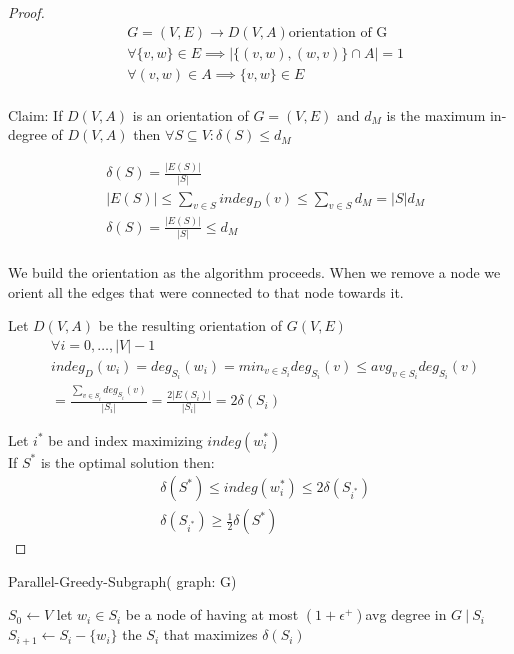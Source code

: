 \documentclass[]{article}
\begin{document}
\begin{proof}
	\begin{align*}
	&G=(V,E) \rightarrow D(V,A) \text{orientation of G}\\
	&\forall \{v, w\} \in E \implies |\{(v, w), (w, v)\}\cap A| = 1\\
	&\forall (v, w) \in A \implies \{v, w\}\in E\\
	\end{align*}
	
	Claim: If $D(V,A)$ is an orientation of $G=(V,E)$ and $d_M$ is the maximum in-degree of $D(V,A)$ then $\forall S \subseteq V: \delta(S) \leq d_M$
	
	\begin{align*}
		&\delta (S) = \frac{|E(S)|}{|S|}\\
		&|E(S)| \leq \sum_{v\in S}^{} indeg_D(v) \leq \sum_{v\in S}^{} d_M = |S| d_M\\
		&\delta (S) = \frac{|E(S)|}{|S|} \leq d_M\\
	\end{align*}
	
	We build the orientation as the algorithm proceeds. When we remove a node we orient all the edges that were connected to that node towards it. 
	
	Let $D(V,A)$ be the resulting orientation of $G(V,E)$
	\begin{align*}
	&\forall i=0,\dots, |V|-1\\
	&{indeg}_D(w_i) = {deg}_{S_i}(w_i) = {min}_{v\in S_i} deg_{S_i}(v) \leq {avg}_{v \in S_i} deg_{S_i}(v)\\
	&= \frac{\sum_{v \in S_i}^{} deg_{S_i}(v)}{|S_i|} =  \frac{2|E(S_i)|}{|S_i|} = 2\delta(S_i)
	\end{align*}
	
	Let $ i^* $  be and index maximizing $ indeg(w_i^*) $\\
	If $ S^* $ is the optimal solution then:
	\begin{align*}
	&\delta(S^*) \leq indeg(w_i^*) \leq 2\delta(S_{i^*}) \\
	&\delta(S_{i^*}) \geq \frac{1}{2} \delta(S^*) 
	\end{align*}

\end{proof}

\begin{algorithm}[H]
	\caption{Parallel-Greedy-Subgraph( graph: G)}
	\label{alg:par-sub-greedy}
	\begin{algorithmic}
		\STATE $S_0 \leftarrow V$
		\STATE let $w_i \in S_i$ be a node of having at most $ (1+\epsilon^+) $avg degree in $G\ |\ S_i$
		\STATE $S_{i+1} \leftarrow S_i - \{w_i\}$
		\ENDFOR
		\RETURN the $S_i$ that maximizes $\delta(S_i)$
	\end{algorithmic}
\end{algorithm}
\end{document}
